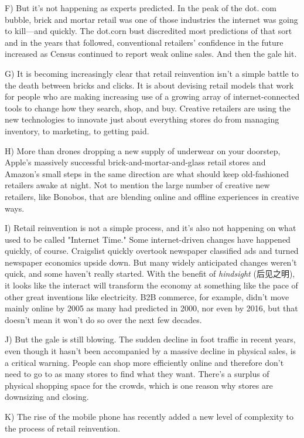 \documentclass[UTF8,11pt]{ctexart}
\begin{document}
F) But it’s not happening as experts predicted. In the peak of the dot. com bubble, brick and mortar retail was one of those industries the internet was going to kill—and quickly. The dot.corn bust discredited most predictions of that sort and in the years that followed, conventional retailers’ confidence in the future increased as Census continued to report weak online sales. And then the gale hit.


G) It is becoming increasingly clear that retail reinvention isn’t a simple battle to the death between bricks and clicks. It is about devising retail models that work for people who are making increasing use of a growing array of internet-connected tools to change how they search, shop, and buy. Creative retailers are using the new technologies to innovate just about everything stores do from managing inventory, to marketing, to getting paid.


H) More than drones dropping a new supply of underwear on your doorstep, Apple’s massively successful brick-and-mortar-and-glass retail stores and Amazon’s small steps in the same direction are what should keep old-fashioned retailers awake at night. Not to mention the large number of creative new retailers, like Bonobos, that are blending online and offline experiences in creative ways.


I) Retail reinvention is not a simple process, and it’s also not happening on what used to be called "Internet Time." Some internet-driven changes have happened quickly, of course. Craigslist quickly overtook newspaper classified ads and turned newspaper economics upside down. But many widely anticipated changes weren’t quick, and some haven’t really started. With the benefit of\textit{ hindsight} (后见之明), it looks like the interact will transform the economy at something like the pace of other great inventions like electricity. B2B commerce, for example, didn’t move mainly online by 2005 as many had predicted in 2000, nor even by 2016, but that doesn’t mean it won’t do so over the next few decades.


J) But the gale is still blowing. The sudden decline in foot traffic in recent years, even though it hasn’t been accompanied by a massive decline in physical sales, is a critical warning. People can shop more efficiently online and therefore don’t need to go to as many stores to find what they want. There’s a surplus of physical shopping space for the crowds, which is one reason why stores are downsizing and closing.


K) The rise of the mobile phone has recently added a new level of complexity to the process of retail reinvention.
\end{document}
